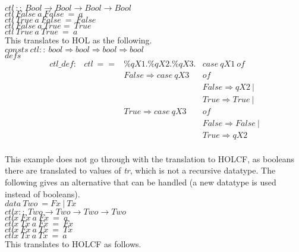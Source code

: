 \documentclass[a4paper,12pt]{article}
\begin{document}
\noindent $ctl \ :: \ Bool \to Bool \to Bool \to Bool$ \\
$ctl \ False \ a \ False \ = \ a $\\
$ctl \ True \ a \ False \ = \ False $\\
$ctl \ False \ a \ True  = \ True $\\
$ctl \ True \ a \ True \ = \ a $\\

\noindent This translates to HOL as the following.\\

\noindent $consts \ ctl :: \ bool \Rightarrow bool \Rightarrow bool \Rightarrow bool$\\

\noindent $defs$
$$\begin{array}{llll} 
ctl\_def : & ctl \ == & \% qX1. \% qX2. \% qX3. & case \ qX1 \ of \\
                                       & &  False \Rightarrow case \ qX3 & of \\
                                       & & &  False \Rightarrow qX2 \ | \\
                                       & & & True \Rightarrow True \ | \\
                                       & & True \Rightarrow case \ qX3 & of \\
                                       & & & False \Rightarrow False \ | \\
                                       & & & True \Rightarrow qX2 \\
\end{array}$$

\noindent This example does not go through with the translation to
HOLCF, as booleans there are translated to values of \emph{tr}, which
is not a recursive datatype. The following gives an alternative that
can be handled (a new datatype is used instead of booleans).\\

\noindent $data \ Two \ =  Fx \ | \ Tx $\\
\noindent $ctlx ::  \ Two \to Two \to Two \to Two $ \\
$ctlx \ Fx \ a \ Fx \ = \ a $ \\
$ctlx \ Tx \ a \ Fx \ = \ Fx $ \\
$ctlx \ Fx \ a \ Tx \ = \ Tx $ \\
$ctlx \ Tx \ a \ Tx \ = \ a $\\

\noindent This translates to HOLCF as follows.\\
\end{document}
